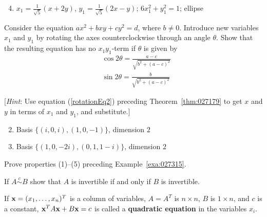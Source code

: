 \begin{multicols}{2}
\begin{ex}
\begin{sol}
\begin{enumerate}[label={\alph*.}]
\setcounter{enumi}{3}
\item $x_{1} = \frac{1}{\sqrt{5}}(x + 2y)$, $y_{1} = \frac{1}{\sqrt{5}}(2x - y)$; $6x_{1}^2 + y_{1}^2 = 1$; ellipse

\end{enumerate}
\end{sol}
\end{ex}

\columnbreak
\begin{ex}
Consider the equation $ax^{2} + bxy + cy^{2} = d$, where $b \neq 0$. Introduce new variables $x_{1}$ and $y_{1}$ by rotating the axes counterclockwise through an angle $\theta$. Show that the resulting equation has no $x_{1}y_{1}$-term if $\theta$ is given by
\begin{align*}
& \cos2\theta = \frac{a - c}{\sqrt{b^2+(a-c)^2}}
 \\ & \sin2\theta = \frac{b}{\sqrt{b^2+(a-c)^2}}
\end{align*}

[\textit{Hint}: Use equation (\ref{rotationEq2}) preceding Theorem~\ref{thm:027179} to get $x$ and $y$ in terms of $x_{1}$ and $y_{1}$, and substitute.]

\begin{sol}
\begin{enumerate}[label={\alph*.}]
\setcounter{enumi}{1}
\item Basis $\{(i, 0, i), (1, 0, -1)\}$, dimension $2$

\setcounter{enumi}{3}
\item Basis $\{(1, 0, -2i), (0, 1, 1 - i)\}$, dimension $2$

\end{enumerate}
\end{sol}
\end{ex}

\begin{ex}
Prove properties (1)--(5) preceding Example~\ref{exa:027315}.
\end{ex}

\begin{ex}
If $A \stackrel{c}{\sim} B$ show that $A$ is invertible if and only if $B$ is invertible.
\end{ex}

\begin{ex}
If $\textbf{x} = (x_{1}, \dots, x_{n})^{T}$ is a column of variables, $A = A^{T}$ is $n \times n$, $B$ is $1 \times n$, and $c$ is a constant, $\textbf{x}^{T}A\textbf{x} + B\textbf{x} = c$ is called a \textbf{quadratic equation} in the variables $x_{i}$.



\end{ex}
\end{multicols}

